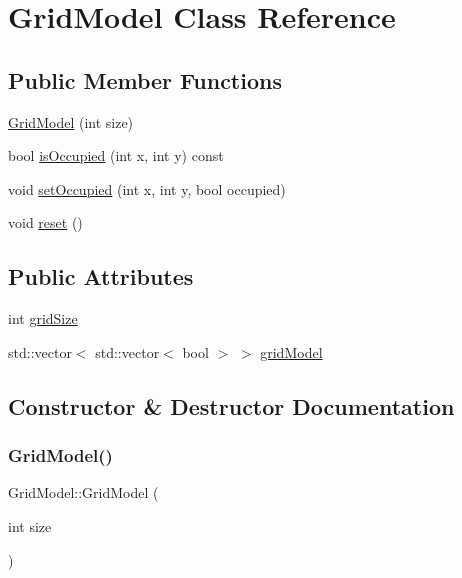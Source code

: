 \hypertarget{classGridModel}{}\section{Grid\+Model Class Reference}
\label{classGridModel}
\subsection*{Public Member Functions}
\begin{DoxyCompactItemize}
\item 
\hyperlink{classGridModel_aaa8bac1cff9a59c7251fe1eecf452533}{Grid\+Model} (int size)
\item 
bool \hyperlink{classGridModel_aa4f57e79f53861e038cb99f2d9c2def1}{is\+Occupied} (int x, int y) const
\item 
void \hyperlink{classGridModel_a1e791c2a1dbe62bc9e7af59e3080637e}{set\+Occupied} (int x, int y, bool occupied)
\item 
void \hyperlink{classGridModel_a6258e9ff7a58b0309b5c6a19b1498c6c}{reset} ()
\end{DoxyCompactItemize}
\subsection*{Public Attributes}
\begin{DoxyCompactItemize}
\item 
int \hyperlink{classGridModel_ad9e4561ef965eaf3594c5738fe3e2bcf}{grid\+Size}
\item 
std\+::vector$<$ std\+::vector$<$ bool $>$ $>$ \hyperlink{classGridModel_abb0600fef78c9377c63e9a34e77c164e}{grid\+Model}
\end{DoxyCompactItemize}


\subsection{Constructor \& Destructor Documentation}
\mbox{\label{classGridModel_aaa8bac1cff9a59c7251fe1eecf452533}} 
\subsubsection{\texorpdfstring{Grid\+Model()}{GridModel()}}
{\footnotesize\ttfamily Grid\+Model\+::\+Grid\+Model (\begin{DoxyParamCaption}\item[{int}]{size }\end{DoxyParamCaption})\hspace{0.3cm}{\ttfamily [inline]}}



